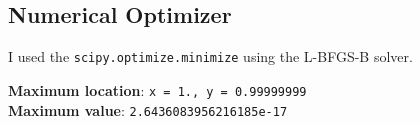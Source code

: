 \documentclass[11pt]{article}
\begin{document}
\subsection{Numerical Optimizer}

I used the \texttt{scipy.optimize.minimize} using the L-BFGS-B solver.

\textbf{Maximum location}: \texttt{x = 1., y = 0.99999999} \\
\textbf{Maximum value}: \texttt{2.6436083956216185e-17}
\end{document}
